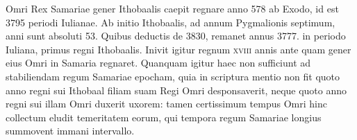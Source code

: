 Omri Rex Samariae
gener Ithobaalis caepit regnare anno 578 ab Exodo, id
est 3795 periodi Iulianae.
Ab initio Ithobaalis, ad annum Pygmalionis
septimum, anni sunt absoluti 53.
Quibus deductis de
3830, remanet annus 3777. in periodo Iuliana, primus regni
Ithobaalis.
Inivit igitur regnum \textsc{xviii} annis ante quam gener eius
Omri in Samaria regnaret.
{}
Quanquam igitur haec non sufficiunt
ad stabiliendam regum Samariae epocham, quia in scriptura mentio
non fit quoto anno regni sui Ithobaal filiam suam Regi Omri desponsaverit,
neque quoto anno regni sui illam Omri duxerit uxorem:
tamen certissimum tempus Omri hinc collectum eludit temeritatem
eorum, qui tempora regum Samariae longius summovent
immani intervallo.

